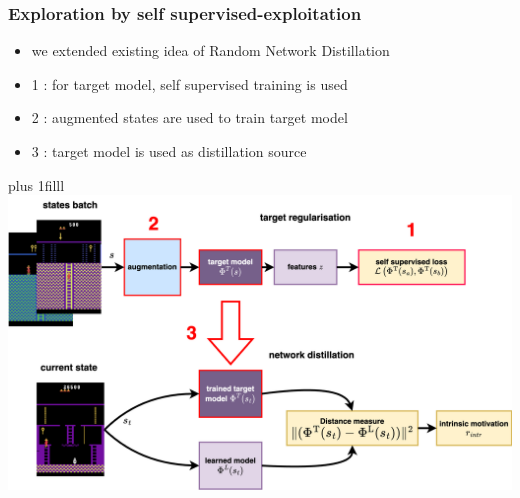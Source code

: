 \documentclass{beamer}
\begin{document}
\begin{frame}
  \frametitle{Exploration by self supervised-exploitation}

  \begin{itemize}
    \item we extended existing idea of Random Network Distillation
    \item {\color{red} 1 : } for target model, self supervised training is used
    \item {\color{red} 2 : } augmented states are used to train target model
    \item {\color{red} 3 : } target model is used as distillation source
  \end{itemize} 

  \vskip 0pt plus 1filll
    \centering
    \includegraphics[scale=0.4]{../diagrams/cnd/cnd-cnd-3.png}

\end{frame}
\end{document}
